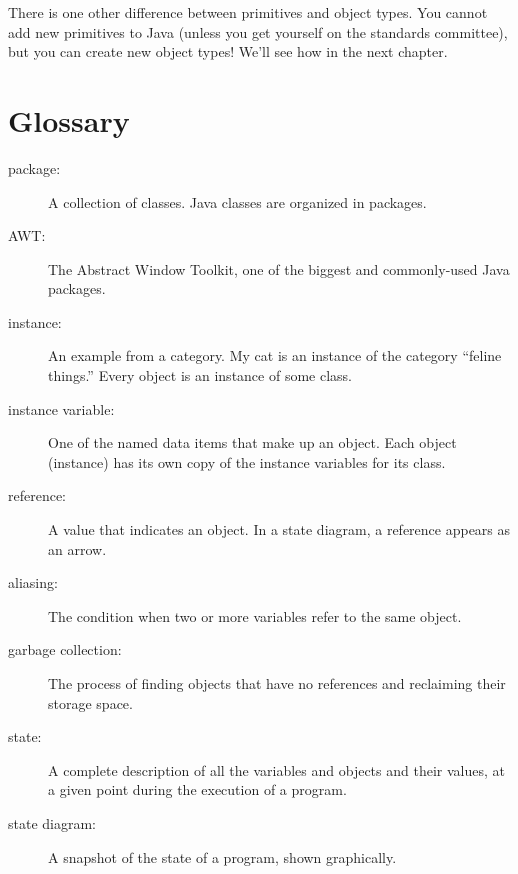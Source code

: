 \documentclass[12pt]{book}
\theoremstyle{exercise}
\begin{document}
There is one other difference between primitives and object
types.  You cannot add new primitives to Java
(unless you get yourself on the standards committee), but
you can create new object types!  We'll see how in the next
chapter.

\section{Glossary}

\begin{description}

\item[package:]  A collection of classes.  Java
classes are organized in packages.

\item[AWT:]  The Abstract Window Toolkit, one of the biggest
and commonly-used Java packages.

\item[instance:]  An example from a category.  My cat is an
instance of the category ``feline things.''  Every object is
an instance of some class.

\item[instance variable:]  One of the named data items that make
up an object.  Each object (instance) has its own copy of
the instance variables for its class.

\item[reference:]  A value that indicates an object.  In a
state diagram, a reference appears as an arrow.

\item[aliasing:] The condition when two or more variables refer
to the same object.

\item[garbage collection:]  The process of finding objects that
have no references and reclaiming their storage space.

\item[state:] A complete description of all the variables and
objects and their values, at a given point during the execution
of a program.

\item[state diagram:] A snapshot of the state of a program, shown
graphically.


\end{description}
\end{document}
